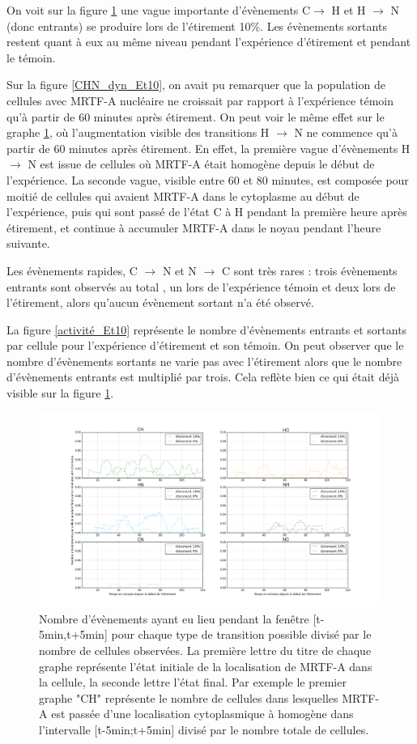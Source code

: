 \documentclass{report}
\begin{document}
On voit sur la figure \ref{transloc_dyn_Et10} une vague importante d'évènements C$\rightarrow$ H et H $\rightarrow$ N (donc entrants) se produire lors de l'étirement 10\%. Les évènements sortants restent quant à eux au même niveau pendant l'expérience d'étirement et pendant le témoin. 

Sur la figure \ref{CHN_dyn_Et10}, on avait pu remarquer que la population de cellules avec MRTF-A nucléaire ne croissait par rapport à l'expérience témoin qu'à partir de 60 minutes après étirement. On peut voir le même effet sur le graphe \ref{transloc_dyn_Et10}, où l'augmentation visible des transitions H $\rightarrow$ N ne commence qu'à partir de 60 minutes après étirement. 
En effet, la première vague d'évènements H $\rightarrow$ N est issue de cellules où MRTF-A était homogène depuis le début de l'expérience. La seconde vague, visible entre 60 et 80 minutes, est composée pour moitié de cellules qui avaient MRTF-A dans le cytoplasme au début de l'expérience, puis qui sont passé de l'état C à H pendant la première heure après étirement, et continue à accumuler MRTF-A dans le noyau pendant l'heure suivante. 

Les évènements rapides, C $\rightarrow$ N et N $\rightarrow$ C sont très rares : trois évènements entrants sont observés au total , un lors de l'expérience témoin et deux lors de l'étirement, alors qu'aucun évènement sortant n'a été observé. 

La figure \ref{activité_Et10} représente le nombre d'évènements entrants et sortants par cellule pour l'expérience d'étirement et son témoin. 
On peut observer que le nombre d'évènements sortants ne varie pas avec l'étirement alors que le nombre d'évènements entrants est multiplié par trois. Cela reflète bien ce qui était déjà visible sur la figure \ref{transloc_dyn_Et10}. 

\begin{figure}
\includegraphics[scale=0.33]{Figures/Etirement10_vs_0_translocations.png} 
\caption{\label{transloc_dyn_Et10} Nombre d'évènements ayant eu lieu pendant la fenêtre [t-5min,t+5min] pour chaque type de transition possible divisé par le nombre de cellules observées. La première lettre du titre de chaque graphe représente l'état initiale de la localisation de MRTF-A dans la cellule, la seconde lettre l'état final. Par exemple le premier graphe "CH" représente le nombre de cellules dans lesquelles MRTF-A est passée d'une localisation cytoplasmique à homogène dans l'intervalle [t-5min;t+5min] divisé par le nombre totale de cellules.}
\end{figure}
\end{document}
